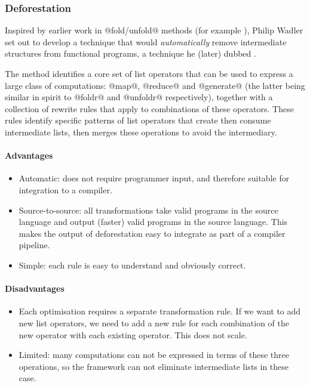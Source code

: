 \subsubsection{Deforestation}

Inspired by earlier work in @fold/unfold@ methods (for example
\citet{Burstall:1977kl}), Philip Wadler set out to develop a technique that
would \emph{automatically} remove intermediate structures from functional
programs, a technique he (later) dubbed 
\cite{Wadler:1981hy,Wadler:1990ix}.

The method identifies a core set of list operators that can be used to express a
large class of computations: @map@, @reduce@ and @generate@ (the
latter being similar in spirit to @foldr@ and @unfoldr@ respectively),
together with a collection of rewrite rules that apply to combinations of these
operators. These rules identify specific patterns of list operators that create
then consume intermediate lists, then merges these operations to avoid the
intermediary.

\paragraph{Advantages}
\begin{itemize}
    \item Automatic: does not require programmer input, and therefore suitable
        for integration to a compiler.

    \item Source-to-source: all transformations take valid programs in the
        source language and output (faster) valid programs in the source
        language. This makes the output of deforestation easy to integrate as
        part of a compiler pipeline.

    \item Simple: each rule is easy to understand and obviously correct.
\end{itemize}

\paragraph{Disadvantages}
\begin{itemize}
    \item Each optimisation requires a separate transformation rule. If we want
        to add new list operators, we need to add a new rule for each
        combination of the new operator with each existing operator. This does
        not scale.

    \item Limited: many computations can not be expressed in terms of these
        three operations, so the framework can not eliminate intermediate lists
        in these case.
\end{itemize}


